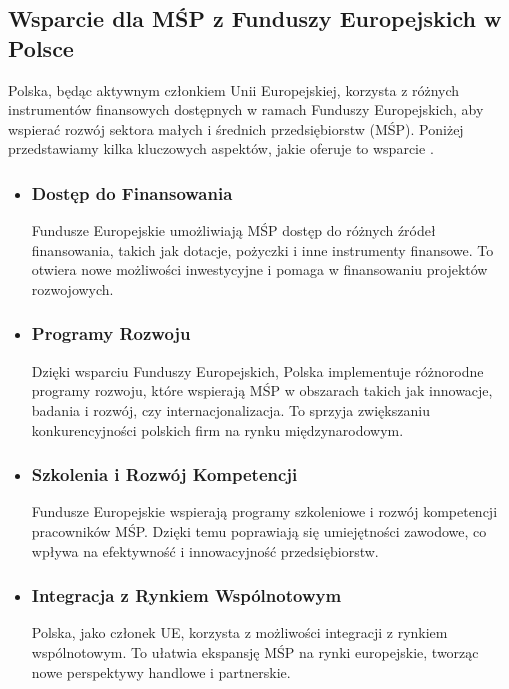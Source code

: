 \documentclass[11pt]{article}
\begin{document}
\subsection*{Wsparcie dla MŚP z Funduszy Europejskich w Polsce}

Polska, będąc aktywnym członkiem Unii Europejskiej, korzysta z różnych instrumentów finansowych dostępnych w ramach Funduszy Europejskich, 
aby wspierać rozwój sektora małych i średnich przedsiębiorstw (MŚP). 
Poniżej przedstawiamy kilka kluczowych aspektów, jakie oferuje to wsparcie \cite{FunduszeEuropejskieMŚP}.

\begin{itemize}
  \item \subsubsection*{Dostęp do Finansowania}
  Fundusze Europejskie umożliwiają MŚP dostęp do różnych źródeł finansowania, takich jak dotacje, pożyczki i inne instrumenty finansowe. 
  To otwiera nowe możliwości inwestycyjne i pomaga w finansowaniu projektów rozwojowych. 
  \item \subsubsection*{Programy Rozwoju}
  Dzięki wsparciu Funduszy Europejskich, Polska implementuje różnorodne programy rozwoju, które wspierają MŚP w obszarach takich jak innowacje, 
  badania i rozwój, czy internacjonalizacja. To sprzyja zwiększaniu konkurencyjności polskich firm na rynku międzynarodowym.
  \item \subsubsection*{Szkolenia i Rozwój Kompetencji}
  Fundusze Europejskie wspierają programy szkoleniowe i rozwój kompetencji pracowników MŚP. Dzięki temu poprawiają się umiejętności zawodowe, 
  co wpływa na efektywność i innowacyjność przedsiębiorstw.
  \item \subsubsection*{Integracja z Rynkiem Wspólnotowym}
  Polska, jako członek UE, korzysta z możliwości integracji z rynkiem wspólnotowym. To ułatwia ekspansję MŚP na rynki europejskie, 
  tworząc nowe perspektywy handlowe i partnerskie.
\end{itemize}
\end{document}
